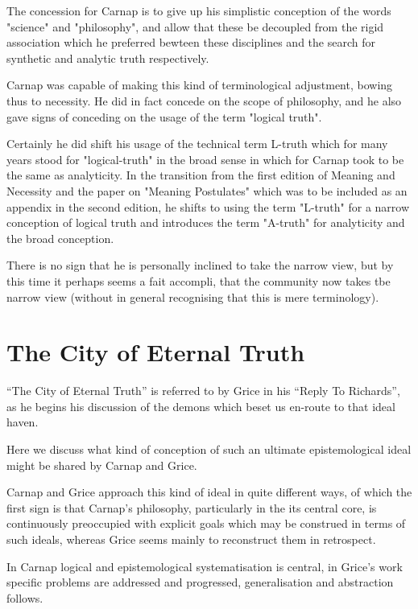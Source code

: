 \documentclass[10pt,titlepage]{book}
\begin{document}
The concession for Carnap is to give up his simplistic conception of the words "science" and "philosophy", and allow that these be decoupled from the rigid association which he preferred bewteen these disciplines and the search for synthetic and analytic truth respectively.

Carnap was capable of making this kind of terminological adjustment, bowing thus to necessity.  He did in fact concede on the scope of philosophy, and he also gave signs of conceding on the usage of the term "logical truth".

Certainly he did shift his usage of the technical term L-truth which for many years stood for "logical-truth" in the broad sense in which for Carnap took to be the same as analyticity.  In the transition from the first edition of Meaning and Necessity and the paper on "Meaning Postulates" which was to be included as an appendix in the second edition, he shifts to using the term "L-truth" for a narrow conception of logical truth and introduces the term "A-truth" for analyticity and the broad conception.

There is no sign that he is personally inclined to take the narrow view, but by this time it perhaps seems a fait accompli, that the community now takes tbe narrow view (without in general recognising that this is mere terminology).

\chapter{The City of Eternal Truth}


``The City of Eternal Truth'' is referred to by Grice in his ``Reply To Richards''\cite{grice86b}, as he begins his discussion of the demons which beset us en-route to that ideal haven.

Here we discuss what kind of conception of such an ultimate epistemological ideal might be shared by Carnap and Grice.

Carnap and Grice approach this kind of ideal in quite different ways, of which the first sign is that Carnap's philosophy, particularly in the its central core, is continuously preoccupied with explicit goals which may be construed in terms of such ideals, whereas Grice seems mainly to reconstruct them in retrospect.

In Carnap logical and epistemological systematisation is central, in Grice's work specific problems are addressed and progressed, generalisation and abstraction follows.
\end{document}
